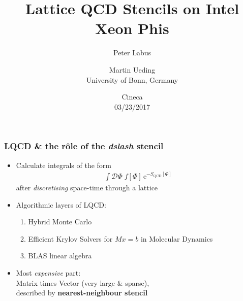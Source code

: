 \documentclass{beamer}
\begin{document}
\allowdisplaybreaks[1]

\title{Lattice QCD Stencils on Intel Xeon Phis}
\author{Peter Labus \and Martin Ueding \\[2ex] University of Bonn, Germany}
  \date{Cineca \\ 03/23/2017}


  \begin{frame}
    \titlepage
  \end{frame}


  \setcounter{framenumber}{0}

  \begin{frame}
    \frametitle{LQCD \& the r\^ole of the \textit{dslash} stencil}

    \begin{itemize}
      \item  Calculate integrals of the form
        \begin{align*}
          \int \mathcal D \Phi \; f[\Phi] \, \mathrm e^{-S_\text{QCD}[\Phi]}
        \end{align*}
        after \textit{discretising} space-time through a lattice
        \vfill

      \item Algorithmic layers of LQCD:
        \begin{enumerate}
          \item Hybrid Monte Carlo
          \item Efficient Krylov Solvers for $Mx=b$ in Molecular Dynamics
          \item BLAS linear algebra
        \end{enumerate}
        \vfill

      \item Most \textit{expensive} part:\\[1mm]
        \hspace{2mm} Matrix times Vector (very large \& sparse),\\
        \hspace{2mm} described by \textbf{nearest-neighbour stencil}
        \vfill
    \end{itemize}

  \end{frame}
\end{document}
